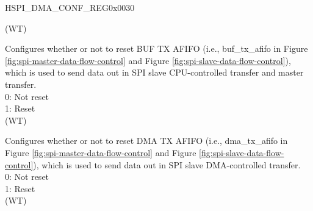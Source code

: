 \begin{register}{H}{SPI\_DMA\_CONF\_REG}{0x0030}
\begin{regdesc}
\begin{reglist}
(WT)
\label{fielddesc:SPI3BUFAFIFORST}\item [SPI\_BUF\_AFIFO\_RST] Configures whether or not to reset BUF TX AFIFO (i.e., buf\_tx\_afifo in Figure \ref{fig:spi-master-data-flow-control} and Figure \ref{fig:spi-slave-data-flow-control}), which is used to send data out in SPI slave CPU-controlled transfer and master transfer.\\
0: Not reset\\
1: Reset \\
(WT)
\label{fielddesc:SPI3DMAAFIFORST}\item [SPI\_DMA\_AFIFO\_RST] Configures whether or not to reset DMA TX AFIFO (i.e., dma\_tx\_afifo in Figure \ref{fig:spi-master-data-flow-control} and Figure \ref{fig:spi-slave-data-flow-control}), which is used to send data out in SPI slave DMA-controlled transfer. \\
0: Not reset\\
1: Reset \\
(WT)
\end{reglist}\end{regdesc}
\end{register}


